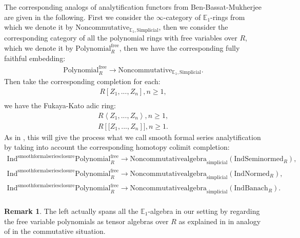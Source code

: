 \documentclass[11pt]{book}
\theoremstyle{definition}
\newtheorem{remark}[theorem]{Remark}
\numberwithin{equation}{section}
\begin{document}
\noindent The corresponding analogs of analytification functors from Ben-Bassat-Mukherjee \cite[Section 4.2]{BBM} are given in the following. First we consider the $\infty$-category of $\mathbb{E}_1$-rings from \cite[Proposition 7.1.4.18, as well as the discussion above Proposition 7.1.4.18 on page 1225]{12Lu2} which we denote it by $\mathrm{Noncommutative}_{\mathbb{E}_1,\mathrm{Simplicial}}$, then we consider the corresponding category of all the polynomial rings with free variables over $R$, which we denote it by $\mathrm{Polynomial}^\mathrm{free}_R$, then we have the corresponding fully faithful embedding:
\begin{align}
\mathrm{Polynomial}^\mathrm{free}_R\rightarrow \mathrm{Noncommutative}_{\mathbb{E}_1,\mathrm{Simplicial}}.	
\end{align}
Then take the corresponding completion for each:
\begin{align}
R\left[Z_1,...,Z_n\right],n\geq 1,\\	
\end{align}
we have the Fukaya-Kato adic ring:
\begin{align}
R\left<Z_1,...,Z_n\right>,n\geq 1,\\
R\left[[Z_1,...,Z_n\right]],n\geq 1.	
\end{align}
As in \cite[Section 4.2]{BBM}, this will give the process what we call smooth formal series analytification by taking into account the corresponding homotopy colimit completion:\\
\begin{align}
\mathrm{Ind}^{\mathrm{smoothformalseriesclosure}}\mathrm{Polynomial}^\mathrm{free}_R\rightarrow \mathrm{Noncommutativealgebra}_{\mathrm{simplicial}}(\mathrm{Ind}\mathrm{Seminormed}_R),\\
\mathrm{Ind}^{\mathrm{smoothformalseriesclosure}}\mathrm{Polynomial}^\mathrm{free}_R\rightarrow \mathrm{Noncommutativealgebra}_{\mathrm{simplicial}}(\mathrm{Ind}\mathrm{Normed}_R),\\
\mathrm{Ind}^{\mathrm{smoothformalseriesclosure}}\mathrm{Polynomial}^\mathrm{free}_R\rightarrow \mathrm{Noncommutativealgebra}_{\mathrm{simplicial}}(\mathrm{Ind}\mathrm{Banach}_R).\\	
\end{align}
\begin{remark}
\indent The left actually spans all the $\mathbb{E}_1$-algebra in our setting by regarding the free variable polynomials as tensor algebras over $R$ as explained in \cite[Proposition 7.1.4.18, as well as the discussion above Proposition 7.1.4.18 on page 1225]{12Lu1} in analogy of \cite[Proposition 7.1.4.20, as well as the discussion above Proposition 7.1.4.20]{12Lu1} in the commutative situation.
\end{remark}
\end{document}

